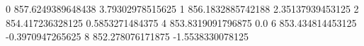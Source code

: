 0 857.6249389648438 3.79302978515625
1 856.1832885742188 2.35137939453125
2 854.417236328125 0.5853271484375
4 853.8319091796875 0.0
6 853.434814453125 -0.3970947265625
8 852.278076171875 -1.5538330078125
